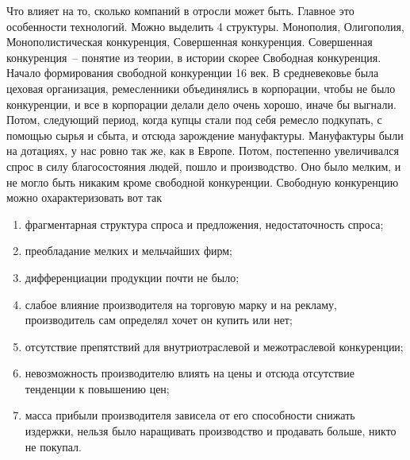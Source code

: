 \documentclass[a4paper, 12pt]{article}
\begin{document}
Что влияет на то, сколько компаний в отросли может быть. Главное это особенности технологий. Можно выделить 4 структуры. Монополия, Олигополия, Монополистическая конкуренция, Совершенная конкуренция. Совершенная конкуренция~-- понятие из теории, в истории скорее Свободная конкуренция. Начало формирования свободной конкуренции 16 век. В средневековье была цеховая организация, ремесленники объединялись в корпорации, чтобы не было конкуренции, и все в корпорации делали дело очень хорошо, иначе бы выгнали. Потом, следующий период, когда купцы стали под себя ремесло подкупать, с помощью сырья и сбыта, и отсюда зарождение мануфактуры. Мануфактуры были на дотациях, у нас ровно так же, как в Европе. Потом, постепенно увеличивался спрос в силу благосостояния людей, пошло и производство. Оно было мелким, и не могло быть никаким кроме свободной конкуренции. Свободную конкуренцию можно охарактеризовать вот так 
\begin{enumerate}
\item фрагментарная структура спроса и предложения, недостаточность спроса;
\item преобладание мелких и мельчайших фирм;
\item дифференциации продукции почти не было;
\item слабое влияние производителя на торговую марку и на рекламу, производитель сам определял хочет он купить или нет;
\item отсутствие препятствий для внутриотраслевой и межотраслевой конкуренции;
\item невозможность производителю влиять на цены и отсюда отсутствие тенденции к повышению цен;
\item масса прибыли производителя зависела от его способности снижать издержки, нельзя было наращивать производство и продавать больше, никто не покупал. 
\end{enumerate}
\end{document}
